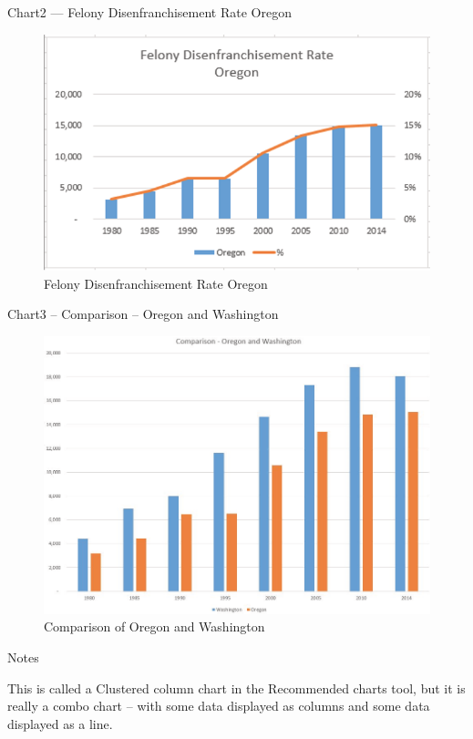 Chart2 — Felony Disenfranchisement Rate Oregon

\begin{figure}[H]
	\centering
	\includegraphics[width=\maxwidth{.95\linewidth}]{gfx/ch04_fig55}
	\caption{Felony Disenfranchisement Rate Oregon}
	\label{04:fig55}
\end{figure}



Chart3 – Comparison – Oregon and Washington

\begin{figure}[H]
	\centering
	\includegraphics[width=\maxwidth{.95\linewidth}]{gfx/ch04_fig56}
	\caption{Comparison of Oregon and Washington}
	\label{04:fig56}
\end{figure}



Notes

This is called a Clustered column chart in the Recommended charts tool, but it is really a combo chart – with some
data displayed as columns and some data displayed as a line.

